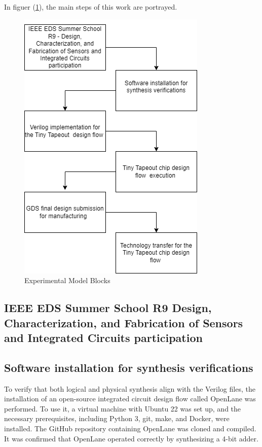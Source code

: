 In figuer (\ref{fig:ExpModelBlocks}), the main steps of this work 
 are portrayed.


 \begin{figure}[H]
    \centering
    \includegraphics[scale=0.6]{Pictures/ExperimentalModel.png}
    \caption{Experimental Model Blocks}
    \label{fig:ExpModelBlocks}
\end{figure}

\subsection{IEEE EDS Summer School R9 \- Design, Characterization, and Fabrication of Sensors and Integrated Circuits participation}


\subsection{Software installation for synthesis verifications}

To verify that both logical and physical synthesis align with the Verilog files, the installation of an  open-source integrated circuit design flow called OpenLane was performed. To use it, a virtual machine with Ubuntu 22 was set up, and the necessary prerequisites, including Python 3, git, make, and Docker, were installed. The GitHub repository containing OpenLane was cloned and compiled. It was confirmed that OpenLane operated correctly by synthesizing a 4-bit adder.
 

